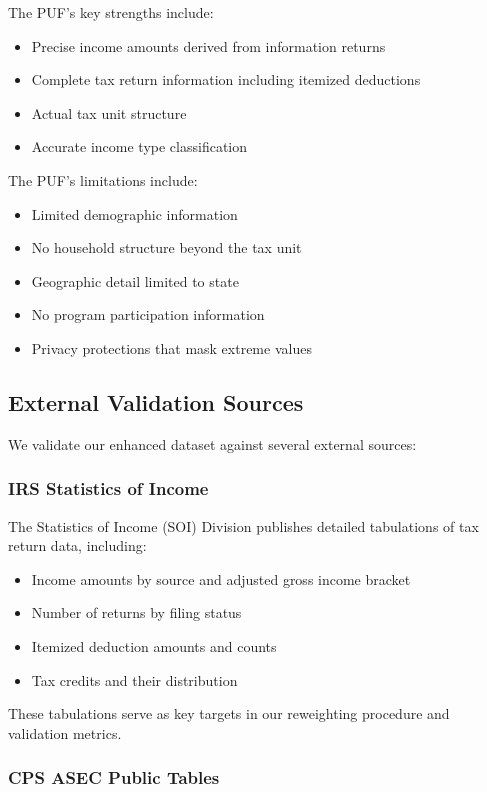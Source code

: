 The PUF's key strengths include:
\begin{itemize}
    \item Precise income amounts derived from information returns
    \item Complete tax return information including itemized deductions
    \item Actual tax unit structure
    \item Accurate income type classification
\end{itemize}

The PUF's limitations include:
\begin{itemize}
    \item Limited demographic information
    \item No household structure beyond the tax unit
    \item Geographic detail limited to state
    \item No program participation information
    \item Privacy protections that mask extreme values
\end{itemize}

\subsection{External Validation Sources}

We validate our enhanced dataset against several external sources:

\subsubsection{IRS Statistics of Income}

The Statistics of Income (SOI) Division publishes detailed tabulations of tax return data, including:
\begin{itemize}
    \item Income amounts by source and adjusted gross income bracket
    \item Number of returns by filing status
    \item Itemized deduction amounts and counts
    \item Tax credits and their distribution
\end{itemize}

These tabulations serve as key targets in our reweighting procedure and validation metrics.

\subsubsection{CPS ASEC Public Tables}

